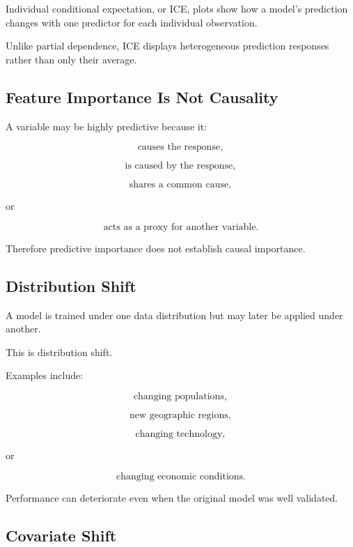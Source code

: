 Individual conditional expectation, or ICE, plots show how a model's
prediction changes with one predictor for each individual observation.

Unlike partial dependence, ICE displays heterogeneous prediction
responses rather than only their average.

\subsection{Feature Importance Is Not Causality}
\label{subsec:importance-not-causality}

A variable may be highly predictive because it:

\[
\boxed{
\text{causes the response},
}
\]

\[
\boxed{
\text{is caused by the response},
}
\]

\[
\boxed{
\text{shares a common cause},
}
\]

or

\[
\boxed{
\text{acts as a proxy for another variable}.
}
\]

Therefore predictive importance does not establish causal importance.

\subsection{Distribution Shift}
\label{subsec:distribution-shift}

A model is trained under one data distribution but may later be applied
under another.

This is distribution shift.

Examples include:

\[
\boxed{
\text{changing populations},
}
\]

\[
\boxed{
\text{new geographic regions},
}
\]

\[
\boxed{
\text{changing technology},
}
\]

or

\[
\boxed{
\text{changing economic conditions}.
}
\]

Performance can deteriorate even when the original model was well
validated.

\subsection{Covariate Shift}
\label{subsec:covariate-shift}

